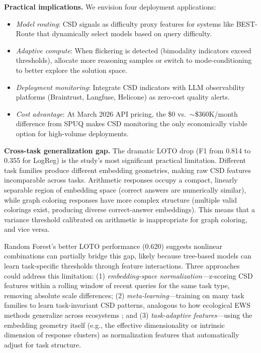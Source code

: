 \documentclass[11pt,letterpaper]{article}
\begin{document}
\textbf{Practical implications.} We envision four deployment applications:
\begin{itemize}
    \item \emph{Model routing}: CSD signals as difficulty proxy features for systems like BEST-Route \cite{ding2025bestroute} that dynamically select models based on query difficulty.
    \item \emph{Adaptive compute}: When flickering is detected (bimodality indicators exceed thresholds), allocate more reasoning samples or switch to mode-conditioning \cite{wu2025modec} to better explore the solution space.
    \item \emph{Deployment monitoring}: Integrate CSD indicators with LLM observability platforms (Braintrust, Langfuse, Helicone) as zero-cost quality alerts.
    \item \emph{Cost advantage}: At March 2026 API pricing, the \$0 vs.\ $\sim$\$360K/month difference from SPUQ makes CSD monitoring the only economically viable option for high-volume deployments.
\end{itemize}

\textbf{Cross-task generalization gap.} The dramatic LOTO drop (F1 from 0.814 to 0.355 for LogReg) is the study's most significant practical limitation. Different task families produce different embedding geometries, making raw CSD features incomparable across tasks. Arithmetic responses occupy a compact, linearly separable region of embedding space (correct answers are numerically similar), while graph coloring responses have more complex structure (multiple valid colorings exist, producing diverse correct-answer embeddings). This means that a variance threshold calibrated on arithmetic is inappropriate for graph coloring, and vice versa.

Random Forest's better LOTO performance (0.620) suggests nonlinear combinations can partially bridge this gap, likely because tree-based models can learn task-specific thresholds through feature interactions. Three approaches could address this limitation: (1) \emph{embedding-space normalization}---z-scoring CSD features within a rolling window of recent queries for the same task type, removing absolute scale differences; (2) \emph{meta-learning}---training on many task families to learn task-invariant CSD patterns, analogous to how ecological EWS methods generalize across ecosystems \cite{bury2021}; and (3) \emph{task-adaptive features}---using the embedding geometry itself (e.g., the effective dimensionality or intrinsic dimension of response clusters) as normalization features that automatically adjust for task structure.
\end{document}
